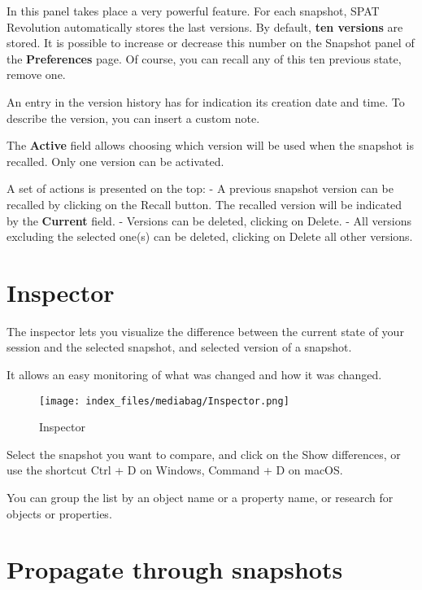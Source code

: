 \documentclass[
  letterpaper,
  DIV=11,
  numbers=noendperiod]{scrreport}
\begin{document}
In this panel takes place a very powerful feature. For each snapshot,
SPAT Revolution automatically stores the last versions. By default,
\textbf{ten versions} are stored. It is possible to increase or decrease
this number on the Snapshot panel of the \textbf{Preferences} page. Of
course, you can recall any of this ten previous state, remove one.

An entry in the version history has for indication its creation date and
time. To describe the version, you can insert a custom note.

The \textbf{Active} field allows choosing which version will be used
when the snapshot is recalled. Only one version can be activated.

A set of actions is presented on the top: - A previous snapshot version
can be recalled by clicking on the Recall button. The recalled version
will be indicated by the \textbf{Current} field. - Versions can be
deleted, clicking on Delete. - All versions excluding the selected
one(s) can be deleted, clicking on Delete all other versions.

\hypertarget{inspector}{%
\section{Inspector}\label{inspector}}

The inspector lets you visualize the difference between the current
state of your session and the selected snapshot, and selected version of
a snapshot.

It allows an easy monitoring of what was changed and how it was changed.

\begin{figure}

{\centering \texttt{[image: index\_files/mediabag/Inspector.png]}

}

\caption{Inspector}

\end{figure}

Select the snapshot you want to compare, and click on the Show
differences, or use the shortcut Ctrl + D on Windows, Command + D on
macOS.

You can group the list by an object name or a property name, or research
for objects or properties.

\hypertarget{propagate-through-snapshots}{%
\section{Propagate through
snapshots}\label{propagate-through-snapshots}}
\end{document}
